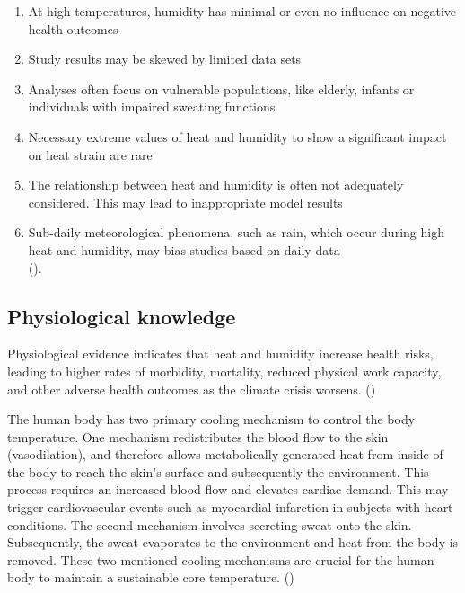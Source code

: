 \documentclass[
]{krantz}
\providecommand{\tightlist}{%
  \setlength{\itemsep}{0pt}\setlength{\parskip}{0pt}}
\begin{document}
\begin{enumerate}
\def\labelenumi{\arabic{enumi})}
\tightlist
\item
  At high temperatures, humidity has minimal or even no influence on negative health outcomes\\
\item
  Study results may be skewed by limited data sets\\
\item
  Analyses often focus on vulnerable populations, like elderly, infants or individuals with impaired sweating functions\\
\item
  Necessary extreme values of heat and humidity to show a significant impact on heat strain are rare\\
\item
  The relationship between heat and humidity is often not adequately considered. This may lead to inappropriate model results\\
\item
  Sub-daily meteorological phenomena, such as rain, which occur during high heat and humidity, may bias studies based on daily data\\
  (\citet{bald}).
\end{enumerate}

\subsection{Physiological knowledge}\label{physiological-knowledge}

Physiological evidence indicates that heat and humidity increase health risks, leading to higher rates of morbidity, mortality, reduced physical work capacity, and other adverse health outcomes as the climate crisis worsens. (\citet{buzan})

The human body has two primary cooling mechanism to control the body temperature. One mechanism redistributes the blood flow to the skin (vasodilation), and therefore allows metabolically generated heat from inside of the body to reach the skin's surface and subsequently the environment. This process requires an increased blood flow and elevates cardiac demand. This may trigger cardiovascular events such as myocardial infarction in subjects with heart conditions.
The second mechanism involves secreting sweat onto the skin. Subsequently, the sweat evaporates to the environment and heat from the body is removed. These two mentioned cooling mechanisms are crucial for the human body to maintain a sustainable core temperature. (\citet{ebi})
\end{document}
